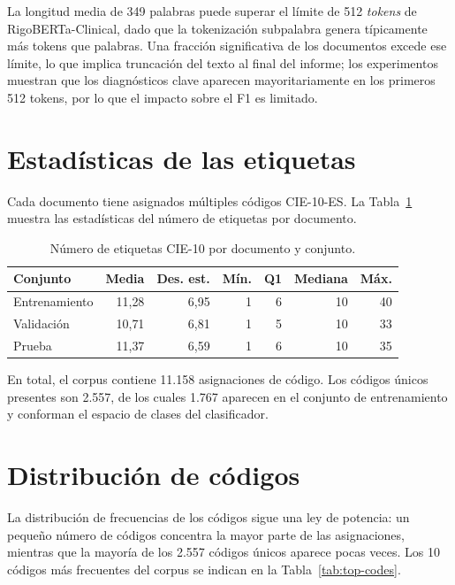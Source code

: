 La longitud media de 349 palabras puede superar el límite de 512 \emph{tokens} de RigoBERTa-Clinical, dado que la tokenización subpalabra genera típicamente más tokens que palabras. Una fracción significativa de los documentos excede ese límite, lo que implica truncación del texto al final del informe; los experimentos muestran que los diagnósticos clave aparecen mayoritariamente en los primeros 512 tokens, por lo que el impacto sobre el F1 es limitado.

\section{Estadísticas de las etiquetas}

Cada documento tiene asignados múltiples códigos CIE-10-ES. La Tabla~\ref{tab:label-stats} muestra las estadísticas del número de etiquetas por documento.

\begin{table}[h]
\centering
\caption{Número de etiquetas CIE-10 por documento y conjunto.}
\label{tab:label-stats}
\begin{tabular}{lrrrrrr}
\hline
\textbf{Conjunto} & \textbf{Media} & \textbf{Des. est.} & \textbf{Mín.} & \textbf{Q1} & \textbf{Mediana} & \textbf{Máx.} \\
\hline
Entrenamiento & 11{,}28 & 6{,}95 & 1 & 6 & 10 & 40 \\
Validación & 10{,}71 & 6{,}81 & 1 & 5 & 10 & 33 \\
Prueba & 11{,}37 & 6{,}59 & 1 & 6 & 10 & 35 \\
\hline
\end{tabular}
\end{table}

En total, el corpus contiene 11.158 asignaciones de código. Los códigos únicos presentes son 2.557, de los cuales 1.767 aparecen en el conjunto de entrenamiento y conforman el espacio de clases del clasificador.

\section{Distribución de códigos}

La distribución de frecuencias de los códigos sigue una ley de potencia: un pequeño número de códigos concentra la mayor parte de las asignaciones, mientras que la mayoría de los 2.557 códigos únicos aparece pocas veces. Los 10 códigos más frecuentes del corpus se indican en la Tabla~\ref{tab:top-codes}.

